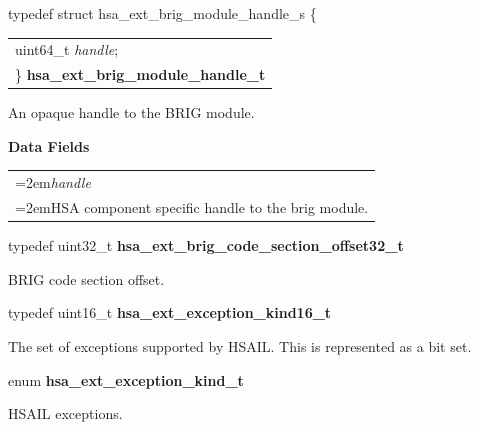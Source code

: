 \documentclass[final]{book}
\newcommand{\reffld}[1]{\textit{#1}}
\begin{document}
\noindent\begin{tcolorbox}[breakable,nobeforeafter,arc=0mm,colframe=white,colback=lightgray,left=0mm]
typedef struct  hsa_ext_brig_module_handle_s \{
\vspace{-3.5mm}\begin{longtable}{@{}p{\textwidth}}
\hspace{1.7em}uint64_t \reffld{handle};\\
\}  \hypertarget{group__FinalizerCoreApi_1ga0216996f5341a8591ecf9e0f6fd1b7e5}{\textbf{hsa_ext_brig_module_handle_t}}
\end{longtable}

\end{tcolorbox}
An opaque handle to the BRIG module.

\noindent\textbf{Data Fields}\\[-6mm]
\begin{longtable}{@{}>{\hangindent=2em}p{\textwidth}}
\reffld{handle}\\\hspace{2em}HSA component specific handle to the brig module.
\end{longtable}



\noindent\begin{tcolorbox}[nobeforeafter,arc=0mm,colframe=white,colback=lightgray,left=0mm]
typedef uint32_t  \hypertarget{group__FinalizerCoreApi_1ga494b8ac14a8c10af95b83b51a8a4ad7f}{\textbf{hsa_ext_brig_code_section_offset32_t}}
\end{tcolorbox}
BRIG code section offset.
\\

\noindent\begin{tcolorbox}[nobeforeafter,arc=0mm,colframe=white,colback=lightgray,left=0mm]
typedef uint16_t  \hypertarget{group__FinalizerCoreApi_1gaf05e7b6c47e7baac1cc9fb203047f168}{\textbf{hsa_ext_exception_kind16_t}}
\end{tcolorbox}
The set of exceptions supported by HSAIL. This is represented as a bit set.
\\

\noindent\begin{tcolorbox}[breakable,nobeforeafter,arc=0mm,colframe=white,colback=lightgray,left=0mm]
enum \hypertarget{group__FinalizerCoreApi_1gaac4b20de831dd17c83c1e2110bac0ef2}{\textbf{hsa_ext_exception_kind_t}}
\end{tcolorbox}
HSAIL exceptions.
\end{document}

